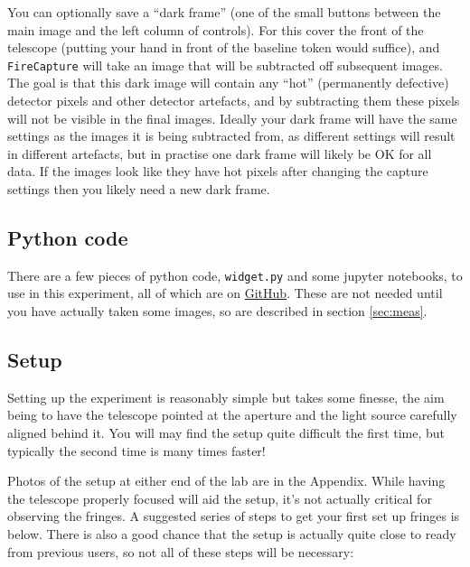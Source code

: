 \documentclass[11pt]{article}
\begin{document}
You can optionally save a ``dark frame'' (one of the small buttons between the main image and the left column of controls). For this cover the front of the telescope (putting your hand in front of the baseline token would suffice), and \texttt{FireCapture} will take an image that will be subtracted off subsequent images. The goal is that this dark image will contain any ``hot'' (permanently defective) detector pixels and other detector artefacts, and by subtracting them these pixels will not be visible in the final images. Ideally your dark frame will have the same settings as the images it is being subtracted from, as different settings will result in different artefacts, but in practise one dark frame will likely be OK for all data. If the images look like they have hot pixels after changing the capture settings then you likely need a new dark frame.

\subsection{Python code}

There are a few pieces of python code, \texttt{widget.py} and some jupyter notebooks, to use in this experiment, all of which are on \href{https://github.com/drgmk/px-interferometry}{GitHub}. These are not needed until you have actually taken some images, so are described in section \ref{sec:meas}.

\clearpage

\subsection{Setup}\label{sec:setup}

Setting up the experiment is reasonably simple but takes some finesse, the aim being to have the telescope pointed at the aperture and the light source carefully aligned behind it. You will may find the setup quite difficult the first time, but typically the second time is many times faster! 

Photos of the setup at either end of the lab are in the Appendix. While having the telescope properly focused will aid the setup, it's not actually critical for observing the fringes. A suggested series of steps to get your first set up fringes is below. There is also a good chance that the setup is actually quite close to ready from previous users, so not all of these steps will be necessary:
\end{document}
